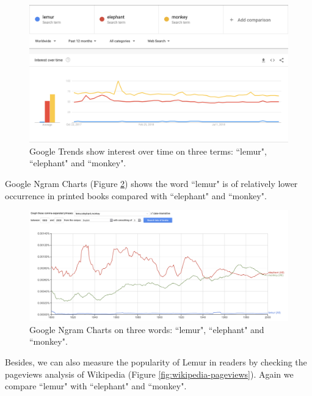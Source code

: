 \documentclass{article}
\begin{document}
\begin{figure}[h]
  \includegraphics[width=\linewidth]{img/google-trend.png}
  \caption{Google Trends show interest over time on three terms: ``lemur", ``elephant" and ``monkey".}
  \label{fig:google-trend}
\end{figure}

Google Ngram Charts (Figure \ref{fig:google-ngram}) shows the word ``lemur" is of relatively lower occurrence in printed books compared with ``elephant" and ``monkey".

\begin{figure}[h]
  \includegraphics[width=\linewidth]{img/google-ngram.png}
  \caption{Google Ngram Charts on three words: ``lemur", ``elephant" and ``monkey".}
  \label{fig:google-ngram}
\end{figure}

Besides, we can also measure the popularity of Lemur in readers by checking the pageviews analysis of Wikipedia (Figure \ref{fig:wikipedia-pageviews}). Again we compare ``lemur" with ``elephant" and ``monkey".
\end{document}

